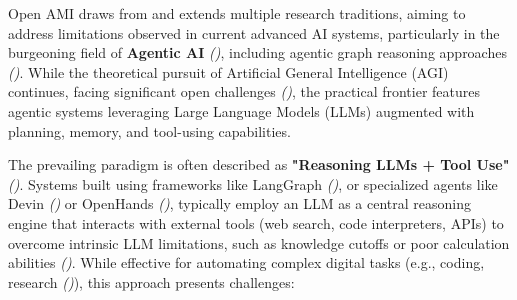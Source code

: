 \documentclass[12pt,a4paper]{report}
\renewcommand{\citep}[1]{\textit{\scriptsize{(\cite{#1})}}}
\begin{document}
	Open AMI draws from and extends multiple research traditions, aiming to address limitations observed in current advanced AI systems, particularly in the burgeoning field of \textbf{Agentic AI} \citep{AgenticLandscape_Ref19}, including agentic graph reasoning approaches \citep{Buehler2025AgenticGraphRef}. While the theoretical pursuit of Artificial General Intelligence (AGI) continues, facing significant open challenges \citep{AdditionalCitationRef27, AdditionalCitationRef27Modern}, the practical frontier features agentic systems leveraging Large Language Models (LLMs) augmented with planning, memory, and tool-using capabilities.
	
	The prevailing paradigm is often described as \textbf{"Reasoning LLMs + Tool Use"} \citep{Yang2025LLMAgentParadigms}. Systems built using frameworks like LangGraph \citep{AgenticLandscape_Ref106, AgenticLandscape_Ref19}, or specialized agents like Devin \citep{AgenticLandscape_Ref14} or OpenHands \citep{OpenHandsRef}, typically employ an LLM as a central reasoning engine that interacts with external tools (web search, code interpreters, APIs) to overcome intrinsic LLM limitations, such as knowledge cutoffs or poor calculation abilities \citep{AgenticLandscape_Ref86}. While effective for automating complex digital tasks (e.g., coding, research \citep{AdditionalCitationRef32, AgenticLandscape_Ref40}), this approach presents challenges:
	
\end{document}
